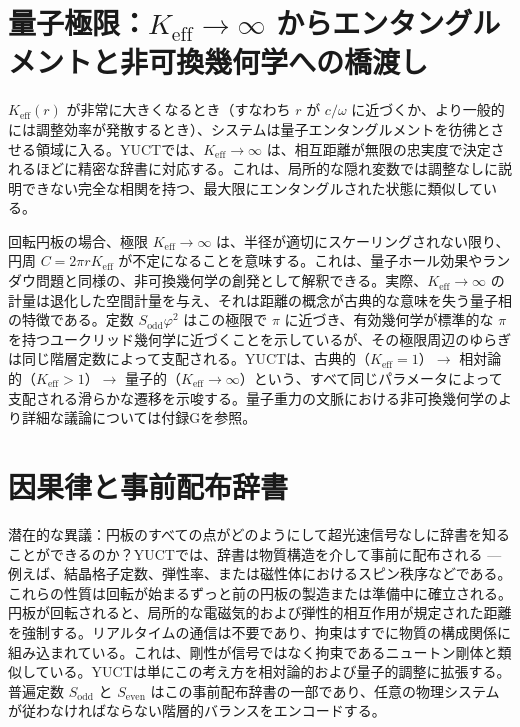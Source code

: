 \documentclass[12pt,a4paper]{article}
\newcommand{\Sodd}{S_{\mathrm{odd}}}
\newcommand{\Seven}{S_{\mathrm{even}}}
\begin{document}
	\section{量子極限：\(K_{\mathrm{eff}} \to \infty\) からエンタングルメントと非可換幾何学への橋渡し}
	\label{sec:quantum-limit}
	
	\(K_{\mathrm{eff}}(r)\) が非常に大きくなるとき（すなわち \(r\) が \(c/\omega\) に近づくか、より一般的には調整効率が発散するとき）、システムは量子エンタングルメントを彷彿とさせる領域に入る。YUCTでは、\(K_{\mathrm{eff}} \to \infty\) は、相互距離が無限の忠実度で決定されるほどに精密な辞書に対応する。これは、局所的な隠れ変数では調整なしに説明できない完全な相関を持つ、最大限にエンタングルされた状態に類似している。
	
	回転円板の場合、極限 \(K_{\mathrm{eff}} \to \infty\) は、半径が適切にスケーリングされない限り、円周 \(C = 2\pi r K_{\mathrm{eff}}\) が不定になることを意味する。これは、量子ホール効果やランダウ問題と同様の、非可換幾何学の創発として解釈できる。実際、\(K_{\mathrm{eff}} \to \infty\) の計量は退化した空間計量を与え、それは距離の概念が古典的な意味を失う量子相の特徴である。定数 \(\Sodd \varphi^2\) はこの極限で \(\pi\) に近づき、有効幾何学が標準的な \(\pi\) を持つユークリッド幾何学に近づくことを示しているが、その極限周辺のゆらぎは同じ階層定数によって支配される。YUCTは、古典的（\(K_{\mathrm{eff}}=1\)）\(\rightarrow\) 相対論的（\(K_{\mathrm{eff}}>1\)）\(\rightarrow\) 量子的（\(K_{\mathrm{eff}}\to\infty\)）という、すべて同じパラメータによって支配される滑らかな遷移を示唆する。量子重力の文脈における非可換幾何学のより詳細な議論については付録Gを参照。
	
	\section{因果律と事前配布辞書}
	\label{sec:causality}
	
	潜在的な異議：円板のすべての点がどのようにして超光速信号なしに辞書を知ることができるのか？YUCTでは、辞書は物質構造を介して事前に配布される — 例えば、結晶格子定数、弾性率、または磁性体におけるスピン秩序などである。これらの性質は回転が始まるずっと前の円板の製造または準備中に確立される。円板が回転されると、局所的な電磁気的および弾性的相互作用が規定された距離を強制する。リアルタイムの通信は不要であり、拘束はすでに物質の構成関係に組み込まれている。これは、剛性が信号ではなく拘束であるニュートン剛体と類似している。YUCTは単にこの考え方を相対論的および量子的調整に拡張する。普遍定数 \(\Sodd\) と \(\Seven\) はこの事前配布辞書の一部であり、任意の物理システムが従わなければならない階層的バランスをエンコードする。
	
\end{document}
